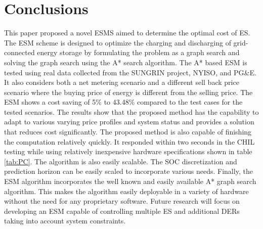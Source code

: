\documentclass[journal]{IEEEtran}
\begin{document}
\section{Conclusions}
This paper proposed a novel ESMS aimed to determine the optimal cost of ES. The ESM scheme is designed to optimize the charging and discharging of grid-connected energy storage by formulating the problem as a graph search and solving the graph search using the A* search algorithm. The A* based ESM is tested using real data collected from the SUNGRIN project, NYISO, and PG\&E. It also considers both a net metering scenario and a different sell back price scenario where the buying price of energy is different from the selling price. The ESM shows a cost saving of 5\% to 43.48\% compared to the test cases for the tested scenarios. The results show that the proposed method has the capability to adapt to various varying price profiles and system status and provides a solution that reduces cost significantly. The proposed method is also capable of finishing the computation relatively quickly. It responded within two seconds in the CHIL testing while using relatively inexpensive hardware specifications shown in table \ref{tab:PC}. The algorithm is also easily scalable. The SOC discretization and prediction horizon can be easily scaled to incorporate various needs. Finally, the ESM algorithm incorporates the well known and easily available A* graph search algorithm. This makes the algorithm easily deployable in a variety of hardware without the need for any proprietary software. Future research will focus on developing an ESM capable of controlling multiple ES and additional DERs taking into account system constraints.




\end{document}
